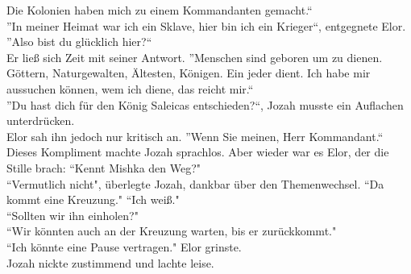 Die Kolonien haben mich zu einem Kommandanten gemacht.``\\
''In meiner Heimat war ich ein Sklave, hier bin ich ein Krieger``, entgegnete Elor.\\
''Also bist du glücklich hier?``\\
Er ließ sich Zeit mit seiner Antwort. ''Menschen sind geboren um zu dienen. Göttern, Naturgewalten, 
Ältesten, Königen. Ein jeder dient. Ich habe mir aussuchen können, wem ich diene, das reicht 
mir.``\\
''Du hast dich für den König Saleicas entschieden?``, Jozah musste ein Auflachen unterdrücken.\\
Elor sah ihn jedoch nur kritisch an. ''Wenn Sie meinen, Herr Kommandant.``\\
Dieses Kompliment machte Jozah sprachlos. Aber wieder war es Elor, der die Stille brach: ``Kennt 
Mishka den Weg?"\\
``Vermutlich nicht", überlegte Jozah, dankbar über den Themenwechsel.
``Da kommt eine Kreuzung."
``Ich weiß."\\
``Sollten wir ihn einholen?"\\
``Wir könnten auch an der Kreuzung warten, bis er zurückkommt."\\
``Ich könnte eine Pause vertragen." Elor grinste.\\
Jozah nickte zustimmend und lachte leise. \\


